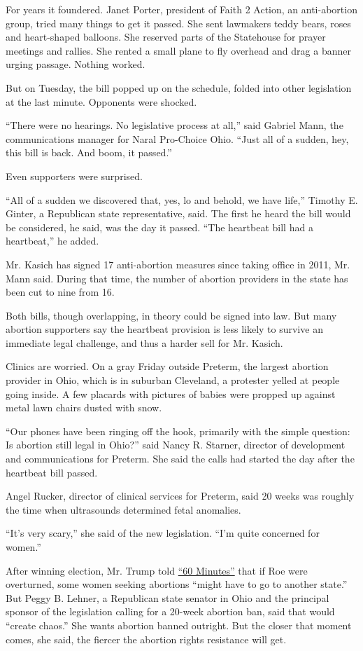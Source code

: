 For years it foundered. Janet Porter, president of Faith 2 Action, an
anti-abortion group, tried many things to get it passed. She sent
lawmakers teddy bears, roses and heart-shaped balloons. She reserved
parts of the Statehouse for prayer meetings and rallies. She rented a
small plane to fly overhead and drag a banner urging passage. Nothing
worked.

But on Tuesday, the bill popped up on the schedule, folded into other
legislation at the last minute. Opponents were shocked.

``There were no hearings. No legislative process at all,'' said Gabriel
Mann, the communications manager for Naral Pro-Choice Ohio. ``Just all
of a sudden, hey, this bill is back. And boom, it passed.''

Even supporters were surprised.

``All of a sudden we discovered that, yes, lo and behold, we have
life,'' Timothy E. Ginter, a Republican state representative, said. The
first he heard the bill would be considered, he said, was the day it
passed. ``The heartbeat bill had a heartbeat,'' he added.

Mr. Kasich has signed 17 anti-abortion measures since taking office in
2011, Mr. Mann said. During that time, the number of abortion providers
in the state has been cut to nine from 16.

Both bills, though overlapping, in theory could be signed into law. But
many abortion supporters say the heartbeat provision is less likely to
survive an immediate legal challenge, and thus a harder sell for Mr.
Kasich.

Clinics are worried. On a gray Friday outside Preterm, the largest
abortion provider in Ohio, which is in suburban Cleveland, a protester
yelled at people going inside. A few placards with pictures of babies
were propped up against metal lawn chairs dusted with snow.

``Our phones have been ringing off the hook, primarily with the simple
question: Is abortion still legal in Ohio?'' said Nancy R. Starner,
director of development and communications for Preterm. She said the
calls had started the day after the heartbeat bill passed.

Angel Rucker, director of clinical services for Preterm, said 20 weeks
was roughly the time when ultrasounds determined fetal anomalies.

``It's very scary,'' she said of the new legislation. ``I'm quite
concerned for women.''

After winning election, Mr. Trump told
\href{http://www.nytimes.com/2016/11/14/us/politics/donald-trump-twitter-white-house.html}{``60
Minutes''} that if Roe were overturned, some women seeking abortions
``might have to go to another state.'' But Peggy B. Lehner, a Republican
state senator in Ohio and the principal sponsor of the legislation
calling for a 20-week abortion ban, said that would ``create chaos.''
She wants abortion banned outright. But the closer that moment comes,
she said, the fiercer the abortion rights resistance will get.


